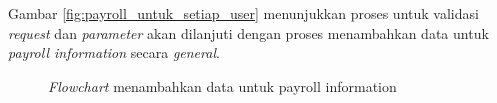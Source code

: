 Gambar \ref{fig:payroll_untuk_setiap_user} menunjukkan proses untuk validasi \textit{request} dan \textit{parameter} akan dilanjuti dengan proses menambahkan data untuk \textit{payroll information} secara \textit{general}.

\begin{figure}[H]
    \centering
    \caption{\textit{Flowchart} menambahkan data untuk payroll information}
    \label{fig:menambahkan_data_payroll_information}
\end{figure}

